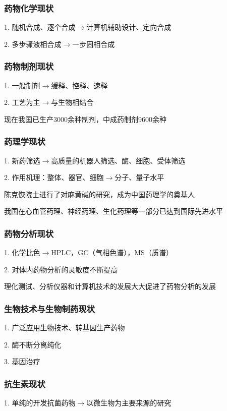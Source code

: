 \subsubsection*{药物化学现状}%
\label{subsub:药物化学现状}
1. 随机合成、逐个合成$\to$计算机辅助设计、定向合成

2. 多步骤液相合成$\to$一步固相合成

\subsubsection*{药物制剂现状}%
\label{subsub:药物制剂现状}
1. 一般制剂$\to$缓释、控释、速释

2. 工艺为主$\to$与生物相结合

\begin{notation}
    现在我国已生产3000余种制剂，中成药制剂9600余种
\end{notation}
\subsubsection*{药理学现状}%
\label{subsub:药理学现状}
1. 新药筛选$\to$高质量的机器人筛选、酶、细胞、受体筛选

2. 作用机理：整体、器官、细胞$\to$分子、量子水平

\begin{notation}
    陈克恢院士进行了对麻黄碱的研究，成为中国药理学的奠基人

    我国在心血管药理、神经药理、生化药理等一部分已达到国际先进水平
\end{notation}
\subsubsection*{药物分析现状}%
\label{subsub:药物分析现状}
1. 化学比色$\to$HPLC，GC（气相色谱），MS（质谱）

2. 对体内药物分析的灵敏度不断提高
\begin{notation}
    理化测试、分析仪器和计算机技术的发展大大促进了药物分析的发展
\end{notation}
\subsubsection*{生物技术与生物制药现状}%
\label{subsub:生物技术与生物制药现状}
1. 广泛应用生物技术、转基因生产药物

2. 酶不断分离纯化

3. 基因治疗
\subsubsection*{抗生素现状}%
\label{subsub:抗生素现状}
1. 单纯的开发抗菌药物$\to$以微生物为主要来源的研究

